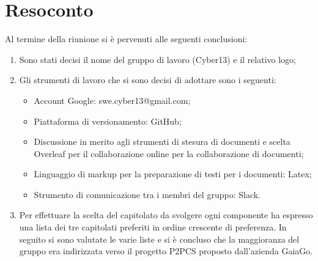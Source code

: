 \documentclass[a4paper, oneside, openany, dvipsnames, table]{article}
\begin{document}
\newpage
\section{Resoconto}
Al termine della riunione si è pervenuti alle seguenti conclusioni:	
\begin{enumerate}
	\item Sono stati decisi il nome del gruppo di lavoro (Cyber13) e il relativo logo;
	\item Gli strumenti di lavoro che si sono decisi di adottare sono i seguenti:
		\begin{itemize}
			\item Account Google: swe.cyber13@gmail.com;
			\item Piattaforma di versionamento: GitHub;
			\item Discussione in merito agli strumenti di stesura di documenti e scelta Overleaf per il collaborazione online per la 			collaborazione di documenti;
			\item Linguaggio di markup per la preparazione di testi per i documenti: Latex;
			\item Strumento di comunicazione tra i membri del gruppo: Slack.
		\end{itemize}
	\item Per effettuare la scelta del capitolato da svolgere ogni componente ha espresso una lista dei tre capitolati preferiti in ordine crescente di preferenza. In seguito si sono valutate le varie liste e si è concluso che la maggioranza del gruppo era indirizzata verso il progetto P2PCS proposto dall'azienda GaiaGo. 
\end{enumerate}
\newpage
\end{document}
